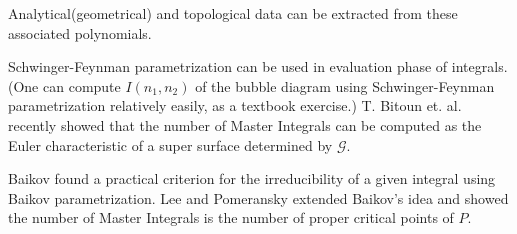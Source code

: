 \documentclass[10pt]{article}
\begin{document}
Analytical(geometrical) and topological data can be extracted from these associated polynomials.

Schwinger-Feynman parametrization can be used in evaluation phase of integrals.
(One can compute $I(n_1,n_2)$ of the bubble diagram using Schwinger-Feynman parametrization relatively easily, as a textbook exercise.)
T. Bitoun et. al. recently showed that the number of Master Integrals can be computed as the Euler characteristic of a super surface determined by $\mathcal{G}$.

Baikov found a practical criterion for the irreducibility of a given integral using Baikov parametrization.
Lee and Pomeransky extended Baikov's idea and showed the number of Master Integrals is the number of proper critical points of $P$.
\end{document}
